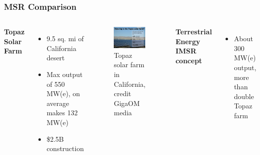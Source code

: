 \begin{frame}
  \frametitle{MSR Comparison}
  
  \begin{columns}
      \column[t]{5cm}
      \textbf{Topaz Solar Farm}

      \begin{itemize}
          \item{9.5 sq. mi of California desert}

          \item{Max output of 550 MW(e), on average makes 132 MW(e)}

          \item{\$2.5B construction}
      \end{itemize}

      \begin{figure}[h]
          \includegraphics[width=\textwidth]{topaz}
          \caption{Topaz solar farm in California, credit GigaOM media}
      \end{figure}

      \column[t]{5cm}
      \textbf{Terrestrial Energy IMSR concept}

      \begin{itemize}
          \item{About 300 MW(e) output, more than double Topaz farm}


\end{itemize}
\end{columns}
\end{frame}
